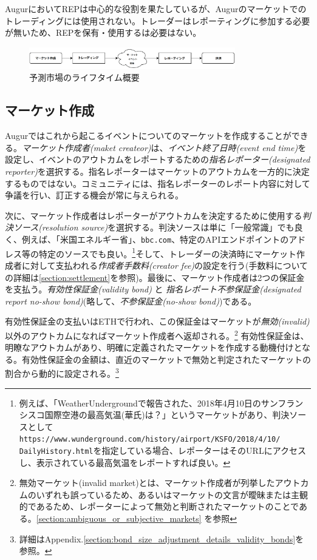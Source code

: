 \documentclass[floatfix,reprint,nofootinbib,amsmath,amssymb,epsfig,pre,floats,letterpaper,groupedaffiliation]{revtex4-1}
\theoremstyle{definition}
\theoremstyle{definition}
\theoremstyle{definition}
\begin{document}
AugurにおいてREPは中心的な役割を果たしているが、Augurのマーケットでのトレーディングには使用されない。トレーダーはレポーティングに参加する必要が無いため、REPを保有・使用するは必要はない。

\begin{figure}
\includegraphics[bb=0 0 860 120, width=0.8\textwidth]{overview.pdf}
\caption{予測市場のライフタイム概要}
\label{fig:overview}
\end{figure}

\subsection{マーケット作成}

Augurではこれから起こるイベントについてのマーケットを作成することができる。\textit{マーケット作成者(maket createor)}は、\textit{イベント終了日時(event end time)}を設定し、イベントのアウトカムをレポートするための\textit{指名レポーター(designated reporter)}を選択する。指名レポーターはマーケットのアウトカムを一方的に決定するものではない。コミュニティには、指名レポーターのレポート内容に対して争議を行い、訂正する機会が常に与えられる。

次に、マーケット作成者はレポーターがアウトカムを決定するために使用する\textit{判決ソース(resolution source)}を選択する。判決ソースは単に「一般常識」でも良く、例えば、「米国エネルギー省」、\texttt{bbc.com}、特定のAPIエンドポイントのアドレス等の特定のソースでも良い。\footnote{例えば、「WeatherUndergroundで報告された、2018年4月10日のサンフランシスコ国際空港の最高気温(華氏)は？」というマーケットがあり、判決ソースとして\texttt{https://www.wunderground.com/history/airport/KSFO/2018/4/10/ DailyHistory.html}を指定している場合、レポーターはそのURLにアクセスし、表示されている最高気温をレポートすれば良い。}そして、トレーダーの決済時にマーケット作成者に対して支払われる\textit{作成者手数料(creator fee)}の設定を行う(手数料についての詳細は\ref{section:settlement}を参照)。最後に、マーケット作成者は2つの保証金を支払う。\textit{有効性保証金(validity bond)} と \textit{指名レポート不参保証金(designated report no-show bond)}(略して、\textit{不参保証金(no-show bond)})である。

有効性保証金の支払いはETHで行われ、この保証金はマーケットが\textit{無効(invalid)}以外のアウトカムになればマーケット作成者へ返却される。\footnote{無効マーケット(invalid market)とは、マーケット作成者が列挙したアウトカムのいずれも誤っているため、あるいはマーケットの文言が曖昧または主観的であるため、レポーターによって無効と判断されたマーケットのことである。\ref{section:ambiguous_or_subjective_markets} を参照}
有効性保証金は、明瞭なアウトカムがあり、明確に定義されたマーケットを作成する動機付けとなる。有効性保証金の金額は、直近のマーケットで無効と判定されたマーケットの割合から動的に設定される。\footnote{詳細はAppendix.\ref{section:bond_size_adjustment_details_validity_bonds}を参照。}
\end{document}
